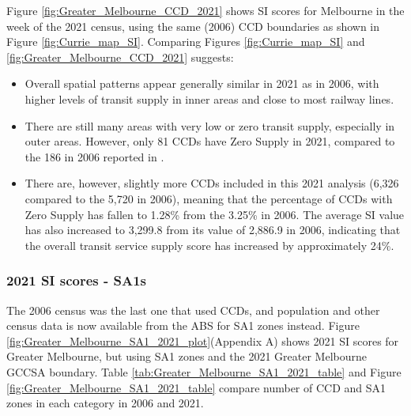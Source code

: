 \documentclass[preprint, 3p,
authoryear]{elsarticle} %
\providecommand{\tightlist}{%
  \setlength{\itemsep}{0pt}\setlength{\parskip}{0pt}}
\begin{document}
Figure \ref{fig:Greater_Melbourne_CCD_2021} shows SI scores for
Melbourne in the week of the 2021 census, using the same (2006) CCD
boundaries as shown in Figure \ref{fig:Currie_map_SI}. Comparing Figures
\ref{fig:Currie_map_SI} and \ref{fig:Greater_Melbourne_CCD_2021}
suggests:

\begin{itemize}
\tightlist
\item
  Overall spatial patterns appear generally similar in 2021 as in 2006,
  with higher levels of transit supply in inner areas and close to most
  railway lines.
\item
  There are still many areas with very low or zero transit supply,
  especially in outer areas. However, only 81 CCDs have Zero Supply in
  2021, compared to the 186 in 2006 reported in
  \citet{currie2010identifying}.
\item
  There are, however, slightly more CCDs included in this 2021 analysis
  (6,326 compared to the 5,720 in 2006), meaning that the percentage of
  CCDs with Zero Supply has fallen to 1.28\% from the 3.25\% in 2006.
  The average SI value has also increased to 3,299.8 from its value of
  2,886.9 in 2006, indicating that the overall transit service supply
  score has increased by approximately 24\%.
\end{itemize}

\subsubsection{2021 SI scores - SA1s}\label{si-scores---sa1s}

The 2006 census was the last one that used CCDs, and population and
other census data is now available from the ABS for SA1 zones instead.
Figure \ref{fig:Greater_Melbourne_SA1_2021_plot}(Appendix A) shows 2021
SI scores for Greater Melbourne, but using SA1 zones and the 2021
Greater Melbourne GCCSA boundary. Table
\ref{tab:Greater_Melbourne_SA1_2021_table} and Figure
\ref{fig:Greater_Melbourne_SA1_2021_table} compare number of CCD and SA1
zones in each category in 2006 and 2021.
\end{document}
